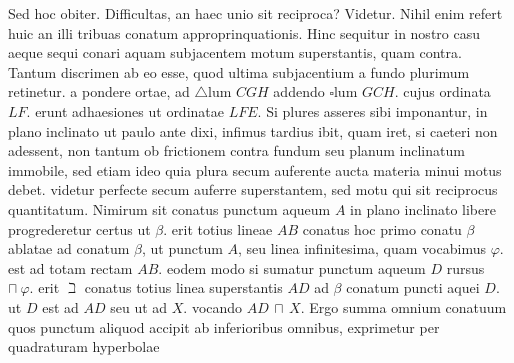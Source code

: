 Sed hoc obiter.
Difficultas, an haec unio sit reciproca?
Videtur.
Nihil enim refert huic an illi tribuas conatum approprinquationis\protect{}. Hinc sequitur in nostro casu aeque sequi conari aquam subjacentem motum superstantis, quam contra. Tantum discrimen ab eo  esse, quod ultima subjacentium a fundo plurimum retinetur.  a pondere\protect{} ortae,  ad $\triangle$lum $CGH$ addendo $\square$lum $GCH.$ cujus ordinata $LF.$
erunt adhaesiones\protect{} ut ordinatae $LFE.$
Si plures asseres sibi imponantur, in plano inclinato ut paulo ante dixi,
infimus tardius ibit, quam iret, si caeteri non adessent,
non tantum ob frictionem\protect{}
contra fundum seu planum inclinatum\protect{} immobile,
sed etiam ideo quia
plura secum auferente aucta materia minui motus debet.
videtur perfecte secum auferre superstantem, sed motu qui sit reciprocus quantitatum.
Nimirum sit conatus\protect{}
punctum aqueum $A$ in plano inclinato\protect{}
libere progrederetur certus ut $\beta.$
erit totius lineae $AB$ conatus hoc primo conatu $\beta$ ablatae ad conatum\protect{} $\beta$,
ut punctum $A$, seu linea infinitesima, quam vocabimus $\varphi.$ est ad totam rectam $AB.$
eodem modo si sumatur punctum aqueum $D$ rursus $\sqcap\ \varphi.$
erit $\beth$ conatus\protect{} totius linea superstantis $AD$ ad $\beta$ conatum puncti aquei $D.$
ut $D$ est ad $AD$ seu ut ad $X.$ vocando $AD\, \sqcap\, X$.
Ergo summa omnium conatuum quos punctum aliquod accipit ab inferioribus omnibus,
exprimetur per quadraturam hyperbolae\protect{}\protect{}
